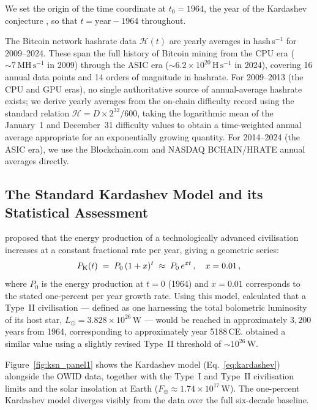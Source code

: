 \documentclass[final,5p,times,twocolumn,authoryear]{elsarticle}
\begin{document}
We set the origin of the time coordinate at $t_0 = 1964$, the year of the
Kardashev conjecture \citep{kar64}, so that
$t = \mathrm{year} - 1964$ throughout.
 
The Bitcoin network hashrate data $\mathcal{H}(t)$ are yearly averages in
hash\,s$^{-1}$ for 2009--2024. These span the full history of Bitcoin
mining from the CPU era ($\sim 7\,\mathrm{MH\,s^{-1}}$ in 2009) through the
ASIC era ($\sim 6.2 \times 10^{20}\,\mathrm{H\,s^{-1}}$ in 2024), covering
16 annual data points and 14 orders of magnitude in hashrate.
For 2009--2013 (the CPU and GPU eras), no single authoritative
source of annual-average hashrate exists; we derive yearly
averages from the on-chain difficulty record using the standard
relation $\mathcal{H} = D \times 2^{32}/600$, taking the logarithmic mean
of the January~1 and December~31 difficulty values to obtain a
time-weighted annual average appropriate for an exponentially
growing quantity. For 2014--2024 (the ASIC era), we use the
Blockchain.com and NASDAQ BCHAIN/HRATE annual averages directly.
 
\subsection{The Standard Kardashev Model and its Statistical Assessment}
\label{sec:kardashev_model}
 
\citet{kar64} proposed that the energy production of a technologically
advanced civilisation increases at a constant fractional rate per year, giving
a geometric series:
\begin{equation}
    P_{\rm K}(t) \;=\; P_0 \,(1 + x)^{t} \;\approx\; P_0\,e^{xt}\,,
    \quad x = 0.01\,,
    \label{eq:kardashev}
\end{equation}
where $P_0$ is the energy production at $t=0$ (1964) and $x = 0.01$
corresponds to the stated one-percent per year growth rate. Using this model,
\citet{kar64} calculated that a Type~II civilisation --- defined as
one harnessing the total bolometric luminosity of its host star,
$L_\odot = 3.828 \times 10^{26}\,\mathrm{W}$ \citep{mamajek2015} --- would
be reached in approximately $3{,}200$\,years from 1964, corresponding to
approximately year 5188\,CE. \citet{sagan73} obtained a similar value
using a slightly revised Type~II threshold of $\sim 10^{26}\,\mathrm{W}$.
 
Figure~\ref{fig:ksn_panel1} shows the Kardashev model (Eq.~\ref{eq:kardashev})
alongside the OWID data, together with the Type~I and Type~II civilisation
limits and the solar insolation at Earth
($F_\oplus \approx 1.74 \times 10^{17}\,\mathrm{W}$). The one-percent
Kardashev model diverges visibly from the data over the full six-decade
baseline.
 
\end{document}
